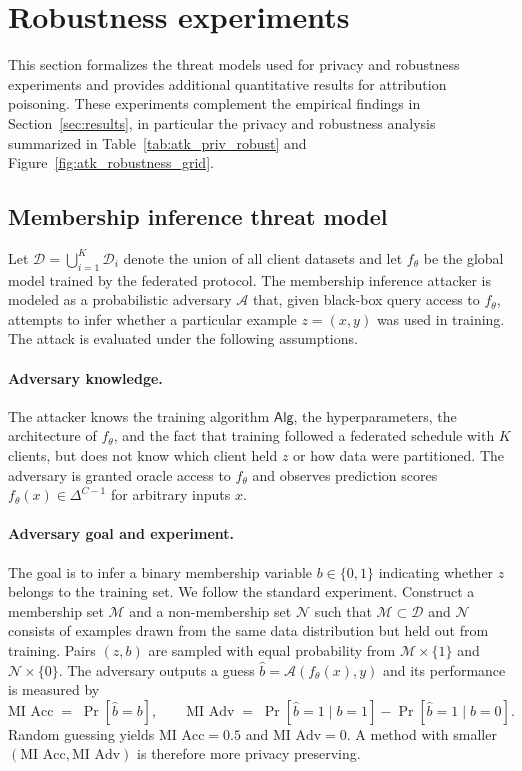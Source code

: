 \documentclass{article}
\theoremstyle{plain}
\theoremstyle{definition}
\theoremstyle{remark}
\begin{document}
\section{Robustness experiments}
\label{app:robustness}

This section formalizes the threat models used for privacy and robustness experiments and provides additional quantitative results for attribution poisoning. These experiments complement the empirical findings in Section~\ref{sec:results}, in particular the privacy and robustness analysis summarized in Table~\ref{tab:atk_priv_robust} and Figure~\ref{fig:atk_robustness_grid}.

\subsection{Membership inference threat model}

Let $\mathcal{D} = \bigcup_{i=1}^{K} \mathcal{D}_i$ denote the union of all client datasets and let $f_{\theta}$ be the global model trained by the federated protocol. The membership inference attacker is modeled as a probabilistic adversary $\mathcal{A}$ that, given black-box query access to $f_{\theta}$, attempts to infer whether a particular example $z=(x,y)$ was used in training. The attack is evaluated under the following assumptions.

\paragraph{Adversary knowledge.}
The attacker knows the training algorithm $\mathsf{Alg}$, the hyperparameters, the architecture of $f_{\theta}$, and the fact that training followed a federated schedule with $K$ clients, but does not know which client held $z$ or how data were partitioned. The adversary is granted oracle access to $f_{\theta}$ and observes prediction scores $f_{\theta}(x)\in\Delta^{C-1}$ for arbitrary inputs $x$.

\paragraph{Adversary goal and experiment.}
The goal is to infer a binary membership variable $b\in\{0,1\}$ indicating whether $z$ belongs to the training set. We follow the standard experiment. Construct a membership set $\mathcal{M}$ and a non-membership set $\mathcal{N}$ such that $\mathcal{M}\subset\mathcal{D}$ and $\mathcal{N}$ consists of examples drawn from the same data distribution but held out from training. Pairs $(z,b)$ are sampled with equal probability from $\mathcal{M}\times\{1\}$ and $\mathcal{N}\times\{0\}$. The adversary outputs a guess $\hat{b} = \mathcal{A}(f_{\theta}(x), y)$ and its performance is measured by
\[
\text{MI Acc} \;=\; \Pr[\hat{b} = b],\qquad
\text{MI Adv} \;=\; \Pr[\hat{b}=1\mid b=1] - \Pr[\hat{b}=1\mid b=0].
\]
Random guessing yields $\text{MI Acc} = 0.5$ and $\text{MI Adv} = 0$. A method with smaller $(\text{MI Acc},\text{MI Adv})$ is therefore more privacy preserving.
\end{document}
